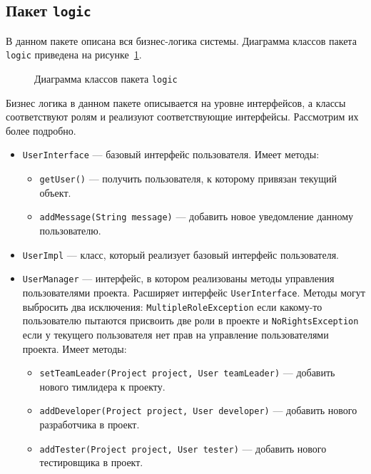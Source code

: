 \subsection{Пакет \texttt{logic}}
В данном пакете описана вся бизнес-логика системы. Диаграмма классов пакета \texttt{logic} приведена на рисунке~\ref{fig:logicDiagram}.
\begin{figure}[h]
\caption{Диаграмма классов пакета \texttt{logic}}
\label{fig:logicDiagram}
\end{figure}

Бизнес логика в данном пакете описывается на уровне интерфейсов, а классы соответствуют ролям и реализуют соответствующие интерфейсы. Рассмотрим их более подробно.

\begin{itemize}
\item \texttt{UserInterface} --- базовый интерфейс пользователя. Имеет методы:
	\begin{itemize}
	\item \texttt{getUser()} --- получить пользователя, к которому привязан текущий объект.
	\item \texttt{addMessage(String message)} --- добавить новое уведомление данному пользователю.
	\end{itemize}

\item \texttt{UserImpl} --- класс, который реализует базовый интерфейс пользователя.

\item \texttt{UserManager} --- интерфейс, в котором реализованы методы управления пользователями проекта. Расширяет интерфейс \texttt{UserInterface}. Методы могут выбросить два исключения: \texttt{MultipleRoleException} если какому-то пользователю пытаются присвоить две роли в проекте и \texttt{NoRightsException} если у текущего пользователя нет прав на управление пользователями проекта. Имеет методы:
	\begin{itemize}
	\item \texttt{setTeamLeader(Project project, User teamLeader)} --- добавить нового тимлидера к проекту.
	\item \texttt{addDeveloper(Project project, User developer)} --- добавить нового разработчика в проект.
	\item \texttt{addTester(Project project, User tester)} --- добавить нового тестировщика в проект.	
	\end{itemize}
	

\end{itemize}
